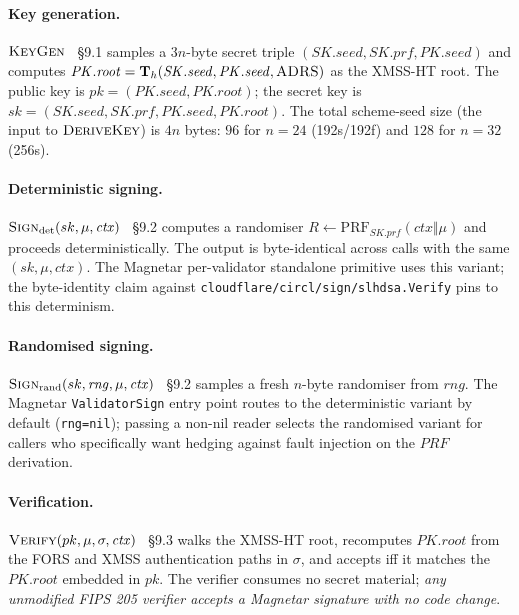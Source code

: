 \paragraph{Key generation.} $\textsc{KeyGen}$ \cite{fips205}~\S9.1
samples a $3n$-byte secret triple $(\mathit{SK.seed},
\mathit{SK.prf}, \mathit{PK.seed})$ and computes
$\mathit{PK.root} = \mathbf{T}_h(\mathit{SK.seed}, \mathit{PK.seed},
\textsc{ADRS})$ as the XMSS-HT root. The public key is
$pk = (\mathit{PK.seed}, \mathit{PK.root})$; the secret key is
$sk = (\mathit{SK.seed}, \mathit{SK.prf}, \mathit{PK.seed},
\mathit{PK.root})$. The total scheme-seed size (the input to
$\textsc{DeriveKey}$) is $4n$ bytes: $96$ for $n=24$ (192s/192f) and
$128$ for $n=32$ (256s).

\paragraph{Deterministic signing.} $\textsc{Sign}_{\mathrm{det}}(sk, \mu,
\mathit{ctx})$ \cite{fips205}~\S9.2 computes a randomiser
$R \gets \mathrm{PRF}_{\mathit{SK.prf}}(\mathit{ctx} \Vert \mu)$ and
proceeds deterministically. The output is byte-identical across calls
with the same $(sk, \mu, \mathit{ctx})$. The Magnetar per-validator
standalone primitive uses this variant; the byte-identity claim
against \texttt{cloudflare/circl/sign/slhdsa.Verify} pins to this
determinism.

\paragraph{Randomised signing.} $\textsc{Sign}_{\mathrm{rand}}(sk,
\mathit{rng}, \mu, \mathit{ctx})$ \cite{fips205}~\S9.2 samples a fresh
$n$-byte randomiser from $\mathit{rng}$. The Magnetar
\texttt{ValidatorSign} entry point routes to the deterministic
variant by default (\texttt{rng=nil}); passing a non-nil reader
selects the randomised variant for callers who specifically want
hedging against fault injection on the $\mathit{PRF}$ derivation.

\paragraph{Verification.} $\textsc{Verify}(pk, \mu, \sigma,
\mathit{ctx})$ \cite{fips205}~\S9.3 walks the XMSS-HT root, recomputes
$\mathit{PK.root}$ from the FORS and XMSS authentication paths in
$\sigma$, and accepts iff it matches the $\mathit{PK.root}$ embedded
in $pk$. The verifier consumes no secret material; \emph{any
unmodified FIPS 205 verifier accepts a Magnetar signature with no
code change}.

